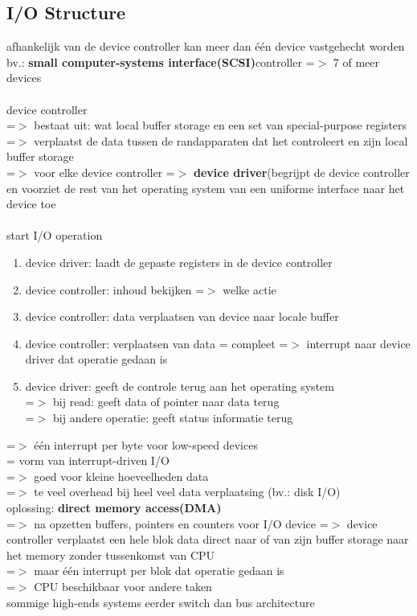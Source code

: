 \documentclass{report}
\begin{document}
\subsection{I/O Structure}
afhankelijk van de device controller kan meer dan \'e\'en device vastgehecht worden
\\bv.: \textbf{small computer-systems interface(SCSI)}controller =$>$ 7 of meer devices
\\
\\device controller
\\=$>$ bestaat uit: wat local buffer storage en een set van special-purpose registers
\\=$>$ verplaatst de data tussen de randapparaten dat het controleert en zijn local buffer storage
\\=$>$ voor elke device controller =$>$ \textbf{device driver}(begrijpt de device controller en voorziet de rest van het operating system van een uniforme interface naar het device toe
\\
\\start I/O operation
\begin{enumerate}
\item device driver: laadt de gepaste registers in de device controller
\item device controller: inhoud bekijken =$>$ welke actie 
\item device controller: data verplaatsen van device naar locale buffer
\item device controller: verplaatsen van data = compleet =$>$ interrupt naar device driver dat operatie gedaan is
\item device driver: geeft de controle terug aan het operating system 
\\=$>$ bij read: geeft data of pointer naar data terug
\\=$>$ bij andere operatie: geeft status informatie terug
\end{enumerate}
=$>$ \'e\'en interrupt per byte voor low-speed devices
\\= vorm van interrupt-driven I/O 
\\=$>$ goed voor kleine hoeveelheden data
\\=$>$ te veel overhead bij heel veel data verplaatsing (bv.: disk I/O)
\\ oplossing: \textbf{direct memory access(DMA)}
\\=$>$ na opzetten buffers, pointers en counters voor I/O device =$>$ device controller verplaatst een hele blok data direct naar of van zijn buffer storage naar het memory zonder tussenkomst van CPU
\\=$>$ maar \'e\'en interrupt per blok dat operatie gedaan is
\\=$>$ CPU beschikbaar voor andere taken
\\sommige high-ends systems eerder switch dan bus architecture
\end{document}
